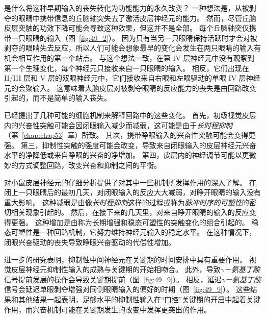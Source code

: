 是什么将这种早期输入的丧失转化为功能能力的永久改变？
一种想法是，从被剥夺的眼睛中携带信息的丘脑轴突失去了激活皮层神经元的能力。
然而，尽管丘脑皮层突触的功效下降可能会导致这种效果，但这并不是全部。
每个丘脑轴突仅携带一只眼睛的输入（图~\ref{fig:49_2}）。
因为只有当另一只眼睛保持活跃时才会对被剥夺的眼睛失去反应，所以人们可能会想象最早的变化会发生在两只眼睛的输入有机会相互作用的第一个站点。
与这个想法一致，在第 IV 层神经元中没有观察到第一个生理变化，每个神经元只接收来自一只眼睛的输入。
相反，它们出现在 II/III 层和 V 层的双眼神经元中，它们接收来自右眼和左眼驱动的单眼 IV 层神经元的会聚输入。
这意味着大脑皮层对被剥夺眼睛的反应能力的丧失是由回路改变引起的，而不是简单的输入丧失。


已经提出了几种可能的细胞机制来解释回路中的这些变化。
首先，初级视觉皮层内的兴奋性突触可能会因闭眼输入减少而减弱，这可能是由于\textit{长时程抑制}（第~\ref{chap:chap53}~章）所致。
其次，携带睁眼输入的兴奋性突触可能会变得更强。
第三，抑制性突触的强度可能会改变，导致来自闭眼输入的皮层神经元兴奋水平的净降低或来自睁眼的兴奋的净增加。
第四，皮层内的神经调节可能以更微妙的方式调整回路，改变兴奋和抑制之间的平衡。


对小鼠皮层神经元的仔细分析提供了对其中一些机制所发挥作用的深入了解。
在闭上一只眼睛后的最初几天，对闭眼输入的反应大大减弱，对睁开眼睛的输入没有重大影响。
这种减弱是由像\textit{长时程抑制}这样的过程或称为\textit{脉冲时序的可塑性}的密切相关现象引起的。
然后，在接下来的几天里，对来自睁开眼睛的输入的反应变得更强。
这种增加是由称为长期增强和稳态可塑性的突触变化的组合引起的。
稳态可塑性是一种回路机制，它努力维持神经元输入的稳定水平。
在这种情况下，闭眼兴奋驱动的丧失导致睁眼兴奋驱动的代偿性增加。


进一步的研究表明，抑制性中间神经元在关键期的时间安排中具有重要作用。
视觉皮层神经元抑制性输入的成熟与关键期的开始相吻合。
此外，导致\textit{$\gamma$－氨基丁酸}信号提前发展的操作会导致关键期提前（图~\ref{fig:49_9}）。
相反，延迟\textit{$\gamma$－氨基丁酸}信号会延迟单眼剥夺增强对同侧眼睛输入的偏好的时期（图~\ref{fig:49_9}）。
这些结果和其他结果一起表明，足够水平的抑制性输入在“门控”关键期的开启中起着关键作用，而兴奋机制可能在关键期发生的改变中发挥更突出的作用。


